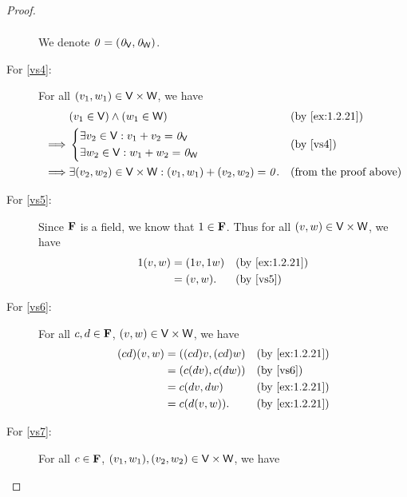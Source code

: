 \begin{proof}
\begin{description}
\begin{align*}
            \end{align*}
            We denote \(\mathit{0} = \left\lparen\mathit{0}_{\mathsf{V}}, \mathit{0}_{\mathsf{W}}\right\rparen\).
        \item[For \ref{vs4}:]
            For all \(\left\lparen v_{1}, w_{1}\right\rparen \in \mathsf{V} \times \mathsf{W}\), we have
            \begin{align*}
                         & \p{v_{1} \in \V} \land \p{w_{1} \in \W}                                                &  & \text{(by \cref{ex:1.2.21})}  \\
                \implies & \begin{dcases}
                    \exists v_{2} \in \V : v_{1} + v_{2} = \zv_{\V} \\
                    \exists w_{2} \in \V : w_{1} + w_{2} = \zv_{\W}
                \end{dcases}                                                             &  & \text{(by \ref{vs4})}         \\
                \implies & \exists \p{v_{2}, w_{2}} \in \V \times \W : \p{v_{1}, w_{1}} + \p{v_{2}, w_{2}} = \zv. &  & \text{(from the proof above)}
            \end{align*}
        \item[For \ref{vs5}:]
            Since \(\mathbf{F}\) is a field, we know that \(1 \in \mathbf{F}\).
            Thus for all \(\left\lparen v, w\right\rparen \in \mathsf{V} \times \mathsf{W}\), we have
            \begin{align*}
                1\p{v, w} & = \p{1v, 1w} &  & \text{(by \cref{ex:1.2.21})} \\
                          & = \p{v, w}.  &  & \text{(by \ref{vs5})}
            \end{align*}
        \item[For \ref{vs6}:]
            For all \(c, d \in \mathbf{F}\), \(\left\lparen v, w\right\rparen \in \mathsf{V} \times \mathsf{W}\), we have
            \begin{align*}
                \p{cd} \p{v, w} & = \p{\p{cd} v, \p{cd} w} &  & \text{(by \cref{ex:1.2.21})} \\
                                & = \p{c\p{dv}, c\p{dw}}   &  & \text{(by \ref{vs6})}        \\
                                & = c \p{dv, dw}           &  & \text{(by \cref{ex:1.2.21})} \\
                                & = c\p{d\p{v, w}}.        &  & \text{(by \cref{ex:1.2.21})}
            \end{align*}
        \item[For \ref{vs7}:]
            For all \(c \in \mathbf{F}\), \(\p{v_{1}, w_{1}}, \p{v_{2}, w_{2}} \in \V \times \W\), we have

\end{description}
\end{proof}
